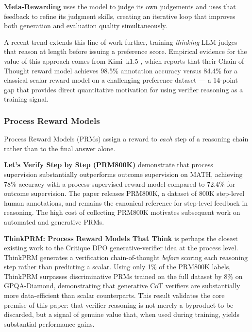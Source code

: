 \vspace{1em}
\textbf{Meta-Rewarding}
\autocite{wu2024metarewardinglanguagemodelsselfimproving} uses the model to judge its own judgements and uses that feedback to refine its judgment skills, creating an iterative loop that improves both generation and evaluation quality simultaneously.

\vspace{1em}
A recent trend extends this line of work further, training \emph{thinking} LLM judges that reason at length before issuing a preference score. Empirical evidence for the value of this approach comes from Kimi~k1.5 \autocite{kimiteam2025kimik15}, which reports that their Chain-of-Thought reward model achieves 98.5\% annotation accuracy versus 84.4\% for a classical scalar reward model on a challenging preference dataset --- a 14-point gap that provides direct quantitative motivation for using verifier reasoning as a training signal.

\subsubsection{Process Reward Models}

Process Reward Models (PRMs) assign a reward to \emph{each} step of a reasoning chain rather than to the final answer alone.

\vspace{1em}
\textbf{Let's Verify Step by Step (PRM800K)}
\autocite{lightman2023letsverifystepstep} demonstrate that process supervision substantially outperforms outcome supervision on MATH, achieving 78\% accuracy with a process-supervised reward model compared to 72.4\% for outcome supervision. The paper releases PRM800K, a dataset of 800K step-level human annotations, and remains the canonical reference for step-level feedback in reasoning. The high cost of collecting PRM800K motivates subsequent work on automated and generative PRMs.

\vspace{1em}
\textbf{ThinkPRM: Process Reward Models That Think}
\autocite{khalifa2025thinkprmprocessrewardmodels} is perhaps the closest existing work to the Critique DPO generative-verifier idea at the process level. ThinkPRM generates a verification chain-of-thought \emph{before} scoring each reasoning step rather than predicting a scalar. Using only 1\% of the PRM800K labels, ThinkPRM surpasses discriminative PRMs trained on the full dataset by 8\% on GPQA-Diamond, demonstrating that generative CoT verifiers are substantially more data-efficient than scalar counterparts. This result validates the core premise of this paper: that verifier reasoning is not merely a byproduct to be discarded, but a signal of genuine value that, when used during training, yields substantial performance gains.

